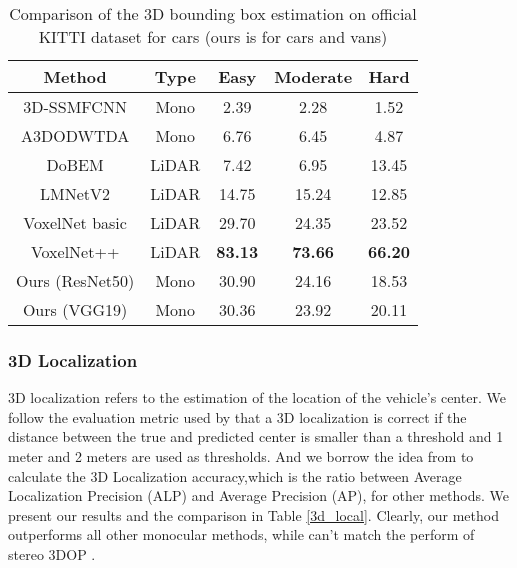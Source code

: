 \begin{table}[H]
	\centering
	\caption{Comparison of the 3D bounding box estimation on official KITTI dataset for cars (ours is for cars and vans)}
	\label{3D_vehicle_detection}
	\begin{tabular}{|c|c|c|c|c|}
		\hline
		Method                                                                   & Type  & Easy           & Moderate       & Hard           \\ \hline
		3D-SSMFCNN \cite{novakmaster2017}                       & Mono  & 2.39           & 2.28           & 1.52           \\ \hline
		A3DODWTDA \cite{erino397fregu856master2018}             & Mono  & 6.76           & 6.45           & 4.87           \\ \hline
		DoBEM \cite{8088147}                                    & LiDAR & 7.42           & 6.95           & 13.45          \\ \hline
		LMNetV2 \cite{2018arXiv180504902M}                      & LiDAR & 14.75          & 15.24          & 12.85          \\ \hline
		VoxelNet basic \cite{DBLP:journals/corr/abs-1711-06396} & LiDAR & 29.70          & 24.35          & 23.52          \\ \hline
		VoxelNet++ \cite{DBLP:journals/corr/abs-1711-06396}     & LiDAR & \textbf{83.13} & \textbf{73.66} & \textbf{66.20} \\ \hline
		Ours (ResNet50)                                                          & Mono  & 30.90          & 24.16          & 18.53          \\ \hline
		Ours (VGG19)																& Mono	& 30.36	& 23.92	& 20.11 \\ \hline
		
	\end{tabular}
\end{table}


\subsubsection{3D Localization}
3D localization refers to the estimation of the location of the vehicle's center. We follow the evaluation metric used by \cite{DBLP:journals/corr/MousavianAFK16, DBLP:journals/corr/ChabotCRTC17} that a 3D localization is correct if the distance between the true and predicted center is smaller than a threshold and 1 meter and 2 meters are used as thresholds. And we borrow the idea from \cite{DBLP:journals/corr/MousavianAFK16} to calculate the 3D Localization accuracy,which is the ratio between Average Localization Precision (ALP) and Average Precision (AP), for other methods. We present our results and the comparison in Table \ref{3d_local}. Clearly, our method outperforms all other monocular methods, while can't match the perform of stereo 3DOP \cite{Chen:2015:OPA:2969239.2969287}.

